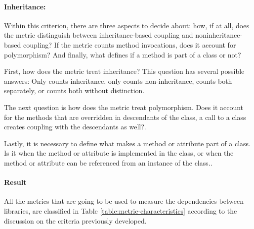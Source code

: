 

\paragraph{Inheritance:}
Within this criterion, there are three aspects to decide about: how, if at all, does the metric distinguish between inheritance-based coupling and noninheritance-based coupling? If the metric counts method invocations, does it account for polymorphism? And finally, what defines if a method is part of a class or not?

First, how does the metric treat inheritance? This question has several possible answers: Only counts inheritance, only counts non-inheritance, counts both separately, or counts both without distinction.

The next question is how does the metric treat polymorphism. Does it account for the methods that are overridden in descendants of the class, a call to a class creates coupling with the descendants as well?.

Lastly, it is necessary to define what makes a method or attribute part of a class. Is it when the method or attribute is implemented in the class, or when the method or attribute can be referenced from an instance of the class..



\paragraph{Result}
All the metrics that are going to be used to measure the dependencies between libraries, are classified in Table \ref{table:metric-characteristics} according to the discussion on the criteria previously developed.

